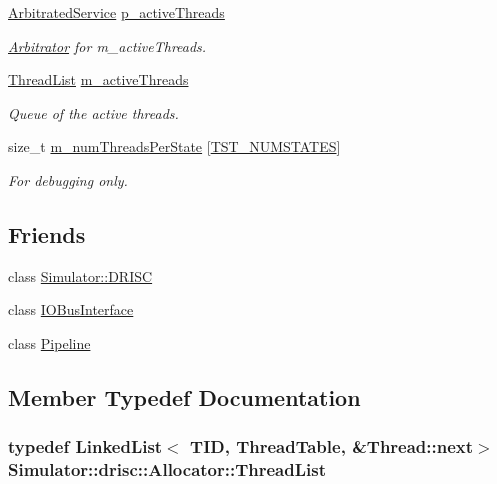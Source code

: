 \begin{DoxyCompactItemize}
\hyperlink{class_simulator_1_1_arbitrated_service}{Arbitrated\+Service} \hyperlink{class_simulator_1_1drisc_1_1_allocator_a0d7b40dd1a49218f3b06231cb198d37f}{p\+\_\+active\+Threads}
\begin{DoxyCompactList}\small\item\em \hyperlink{class_simulator_1_1_arbitrator}{Arbitrator} for m\+\_\+active\+Threads. \end{DoxyCompactList}\item 
\hyperlink{class_simulator_1_1drisc_1_1_allocator_acee4df99e4e6a73556f46dd8ad5aa6e1}{Thread\+List} \hyperlink{class_simulator_1_1drisc_1_1_allocator_a8bf29138e7a3f0a83d0ef204542a39af}{m\+\_\+active\+Threads}
\begin{DoxyCompactList}\small\item\em Queue of the active threads. \end{DoxyCompactList}\item 
size\+\_\+t \hyperlink{class_simulator_1_1drisc_1_1_allocator_ab8d660cc10fde6d79364a5836889e567}{m\+\_\+num\+Threads\+Per\+State} \mbox{[}\hyperlink{namespace_simulator_a5450f6fb4b10ec16b290049311b8d5d0a78a2fff5d83cad45629b181024323bdf}{T\+S\+T\+\_\+\+N\+U\+M\+S\+T\+A\+T\+E\+S}\mbox{]}
\begin{DoxyCompactList}\small\item\em For debugging only. \end{DoxyCompactList}\end{DoxyCompactItemize}
\subsection*{Friends}
\begin{DoxyCompactItemize}
\item 
class \hyperlink{class_simulator_1_1drisc_1_1_allocator_a14f94eb83e17d9d8841f39b37431d673}{Simulator\+::\+D\+R\+I\+S\+C}
\item 
class \hyperlink{class_simulator_1_1drisc_1_1_allocator_af8f116e67dbda7135aa0e584293ac685}{I\+O\+Bus\+Interface}
\item 
class \hyperlink{class_simulator_1_1drisc_1_1_allocator_af9f0f1adbd5baee7830839447205af8d}{Pipeline}
\end{DoxyCompactItemize}


\subsection{Member Typedef Documentation}
\hypertarget{class_simulator_1_1drisc_1_1_allocator_acee4df99e4e6a73556f46dd8ad5aa6e1}{
\subsubsection[{Thread\+List}]{\setlength{\rightskip}{0pt plus 5cm}typedef {\bf Linked\+List}$<$ {\bf T\+I\+D}, {\bf Thread\+Table}, \&{\bf Thread\+::next}$>$ {\bf Simulator\+::drisc\+::\+Allocator\+::\+Thread\+List}}}\label{class_simulator_1_1drisc_1_1_allocator_acee4df99e4e6a73556f46dd8ad5aa6e1}


